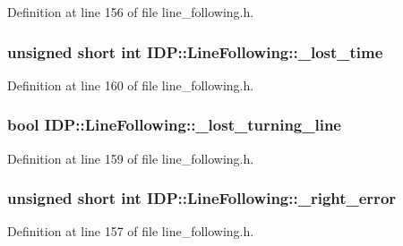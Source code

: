 Definition at line 156 of file line\_\-following.h.

\hypertarget{classIDP_1_1LineFollowing_acc5f7d1d33c49ae1be9de702122aac02}{
\subsubsection[{\_\-lost\_\-time}]{\setlength{\rightskip}{0pt plus 5cm}unsigned short int {\bf IDP::LineFollowing::\_\-lost\_\-time}}}
\label{classIDP_1_1LineFollowing_acc5f7d1d33c49ae1be9de702122aac02}


Definition at line 160 of file line\_\-following.h.

\hypertarget{classIDP_1_1LineFollowing_a76fe578bf4bbd847e74bb1b9bfab7149}{
\subsubsection[{\_\-lost\_\-turning\_\-line}]{\setlength{\rightskip}{0pt plus 5cm}bool {\bf IDP::LineFollowing::\_\-lost\_\-turning\_\-line}}}
\label{classIDP_1_1LineFollowing_a76fe578bf4bbd847e74bb1b9bfab7149}


Definition at line 159 of file line\_\-following.h.

\hypertarget{classIDP_1_1LineFollowing_ac74d1f91775296a217ff1aa4ecf00ae9}{
\subsubsection[{\_\-right\_\-error}]{\setlength{\rightskip}{0pt plus 5cm}unsigned short int {\bf IDP::LineFollowing::\_\-right\_\-error}}}
\label{classIDP_1_1LineFollowing_ac74d1f91775296a217ff1aa4ecf00ae9}


Definition at line 157 of file line\_\-following.h.

